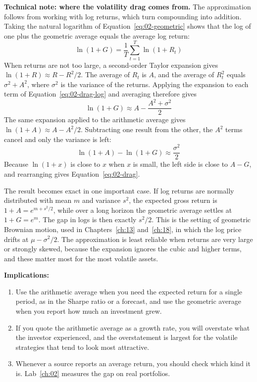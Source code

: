 \begin{technote}
\textbf{Technical note: where the volatility drag comes from.} The approximation follows from working with log returns, which turn compounding into addition. Taking the natural logarithm of Equation~\eqref{eq:02-geometric} shows that the log of one plus the geometric average equals the average log return:
\begin{equation}
  \ln(1+G) = \frac{1}{T}\sum_{t=1}^{T} \ln(1+R_t)
  \label{eq:02-drag-log}
\end{equation}
When returns are not too large, a second-order Taylor expansion gives $\ln(1+R) \approx R - R^2/2$. The average of $R_t$ is $A$, and the average of $R_t^2$ equals $\sigma^2 + A^2$, where $\sigma^2$ is the variance of the returns. Applying the expansion to each term of Equation~\eqref{eq:02-drag-log} and averaging therefore gives
\begin{equation}
  \ln(1+G) \approx A - \frac{A^2 + \sigma^2}{2}
\end{equation}
The same expansion applied to the arithmetic average gives $\ln(1+A) \approx A - A^2/2$. Subtracting one result from the other, the $A^2$ terms cancel and only the variance is left:
\begin{equation}
  \ln(1+A) - \ln(1+G) \approx \frac{\sigma^2}{2}
\end{equation}
Because $\ln(1+x)$ is close to $x$ when $x$ is small, the left side is close to $A - G$, and rearranging gives Equation~\eqref{eq:02-drag}.

The result becomes exact in one important case. If log returns are normally distributed with mean $m$ and variance $s^2$, the expected gross return is $1 + A = e^{m + s^2/2}$, while over a long horizon the geometric average settles at $1 + G = e^{m}$. The gap in logs is then exactly $s^2/2$. This is the setting of geometric Brownian motion, used in Chapters~\ref{ch:13} and~\ref{ch:18}, in which the log price drifts at $\mu - \sigma^2/2$. The approximation is least reliable when returns are very large or strongly skewed, because the expansion ignores the cubic and higher terms, and these matter most for the most volatile assets.
\end{technote}

\textbf{Implications:}
\begin{enumerate}
\item Use the arithmetic average when you need the expected return for a single period, as in the Sharpe ratio or a forecast, and use the geometric average when you report how much an investment grew. 
\item If you quote the arithmetic average as a growth rate, you will overstate what the investor experienced, and the overstatement is largest for the volatile strategies that tend to look most attractive. 
\item Whenever a source reports an average return, you should check which kind it is. Lab~\ref{ch:02} measures the gap on real portfolios.
\end{enumerate}


